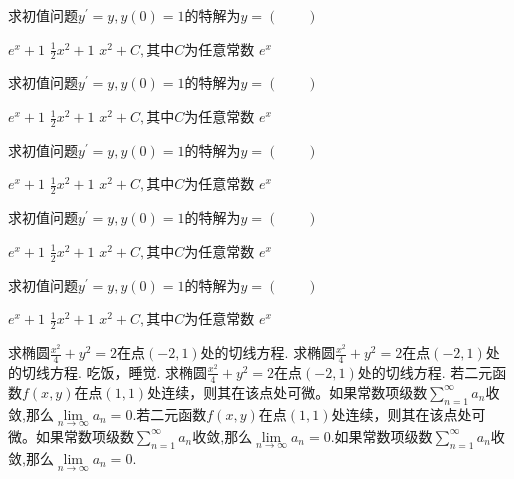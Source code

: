 \documentclass[twoside,12pt]{hnuexam}
\begin{document}
\begin{questions}
	\question
	求初值问题$y^\prime=y,y(0)=1$的特解为$y=$\hfill $(\qquad)$

	\begin{oneparchoices}
		\choice $e^x+1$
		\choice	$\frac{1}{2}x^2+1$
		\choice $x^2+C,\text{其中}C$为任意常数
		\CorrectChoice $e^x$
	\end{oneparchoices}

	\question
		求初值问题$y^\prime=y,y(0)=1$的特解为$y=$\hfill $(\qquad)$
	
		\begin{oneparchoices}
			\choice $e^x+1$
			\choice	$\frac{1}{2}x^2+1$
			\choice $x^2+C,\text{其中}C$为任意常数
			\CorrectChoice $e^x$
		\end{oneparchoices}

\question
	求初值问题$y^\prime=y,y(0)=1$的特解为$y=$\hfill $(\qquad)$

	\begin{oneparchoices}
		\choice $e^x+1$
		\choice	$\frac{1}{2}x^2+1$
		\choice $x^2+C,\text{其中}C$为任意常数
		\CorrectChoice $e^x$
	\end{oneparchoices}


\question
	求初值问题$y^\prime=y,y(0)=1$的特解为$y=$\hfill $(\qquad)$

	\begin{oneparchoices}
		\choice $e^x+1$
		\choice	$\frac{1}{2}x^2+1$
		\choice $x^2+C,\text{其中}C$为任意常数
		\CorrectChoice $e^x$
	\end{oneparchoices}


	\question
		求初值问题$y^\prime=y,y(0)=1$的特解为$y=$\hfill $(\qquad)$
	
		\begin{oneparchoices}
			\choice $e^x+1$
			\choice	$\frac{1}{2}x^2+1$
			\choice $x^2+C,\text{其中}C$为任意常数
			\CorrectChoice $e^x$
		\end{oneparchoices}

	\makepart{填空题}{3}{15}
	\question 求椭圆$\frac{x^2}{4}+y^2=2$在点$(-2,1)$处的切线方程\fillin[$x-2y+4=0$][1.5in].
	\question 求椭圆$\frac{x^2}{4}+y^2=2$在点$(-2,1)$处的切线方程\fillin[$x-2y+4=0$][2in].
	\question 吃饭，睡觉\fillin[打豆豆][0.5in].	
	\question 求椭圆$\frac{x^2}{4}+y^2=2$在点$(-2,1)$处的切线方程\fillin[$x-2y+4=0$][2in].
	\question 若二元函数$f(x,y)$在点$(1,1)$处连续，则其在该点处可微。\hfill\tf[\XSolidBrush]
	\question 如果常数项级数$\sum\limits_{n=1}^{\infty}a_n$收敛,那么$\lim\limits_{n\to \infty}a_n=0$.\hfill\tf[\Checkmark]
	\question 若二元函数$f(x,y)$在点$(1,1)$处连续，则其在该点处可微。\hfill\tf[\XSolidBrush]
	\question 如果常数项级数$\sum\limits_{n=1}^{\infty}a_n$收敛,那么$\lim\limits_{n\to \infty}a_n=0$.\hfill\tf[\Checkmark]
		\question 如果常数项级数$\sum\limits_{n=1}^{\infty}a_n$收敛,那么$\lim\limits_{n\to \infty}a_n=0$.\hfill\tf[\Checkmark]
		

\end{questions}
\end{document}
